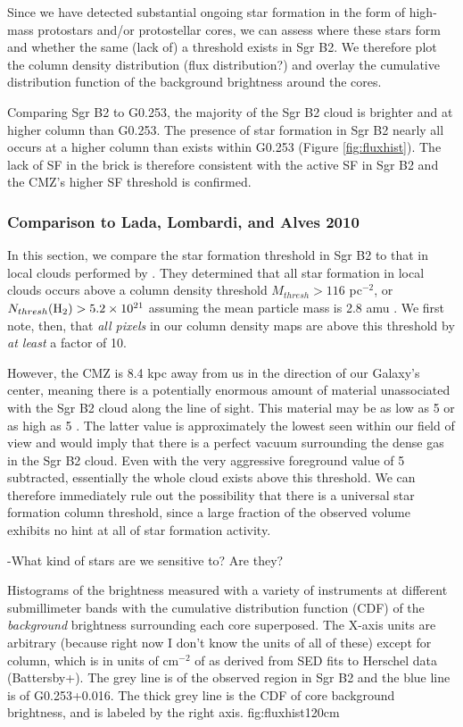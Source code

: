 \documentclass{emulateapj}
\begin{document}
Since we have detected substantial ongoing star formation in the form of
high-mass protostars and/or protostellar cores, we can assess where these stars
form and whether the same (lack of) a threshold exists in Sgr B2.  We therefore
plot the column density distribution (flux distribution?) and overlay the
cumulative distribution function of the background brightness around the cores.

Comparing Sgr B2 to G0.253, the majority of the Sgr B2 cloud is brighter and at
higher column than G0.253.  The presence of star formation in Sgr B2 nearly all
occurs at a higher column than exists within G0.253 (Figure
\ref{fig:fluxhist}).  The lack of SF in the brick is therefore consistent with
the active SF in Sgr B2 and the CMZ's higher SF threshold is confirmed.

\subsubsection{Comparison to Lada, Lombardi, and Alves 2010}
In this section, we compare the star formation threshold in Sgr B2 to that in
local clouds performed by \citet{Lada2010a}.  They determined that all star
formation in local clouds occurs above a column density threshold $M_{thresh} >
116$ \msun pc$^{-2}$, or $N_{thresh}(\textrm{H}_{2}) > 5.2\times10^{21}$ \persc assuming the
mean particle mass is 2.8 amu \citep{Kauffmann2008a}.  We first note, then,
that \emph{all pixels} in our column density maps are above this threshold
by \emph{at least} a factor of 10.

However, the CMZ is 8.4 kpc away from us in the direction of our Galaxy's
center, meaning there is a potentially enormous amount of material unassociated
with the Sgr B2 cloud along the line of sight.  This material may be as low as
5 \persc or as high as 5 \persc.  The latter value is
approximately the lowest seen within our field of view and would imply that
there is a perfect vacuum surrounding the dense gas in the Sgr B2 cloud.
Even with the very aggressive foreground value of 5 \persc subtracted,
essentially the whole cloud exists above this threshold.  We can therefore
immediately rule out the possibility that there is a universal star formation
column threshold, since a large fraction of the observed volume exhibits
no hint at all of star formation activity.

-What kind of stars are we sensitive to?  Are they?


{Histograms of the brightness measured with a variety of instruments at
different submillimeter bands with the cumulative distribution function (CDF)
of the \emph{background} brightness surrounding each core superposed.  The
X-axis units are arbitrary (because right now I don't know the units of all of
these) except for column, which is in units of cm$^{-2}$ of \hh as derived from
SED fits to Herschel data (Battersby+).  The grey line is of the observed
region in Sgr B2 and the blue line is of G0.253+0.016.  The thick grey line is
the CDF of core background brightness, and is labeled by the right axis.}
{fig:fluxhist}{1}{20cm}




\end{document}
